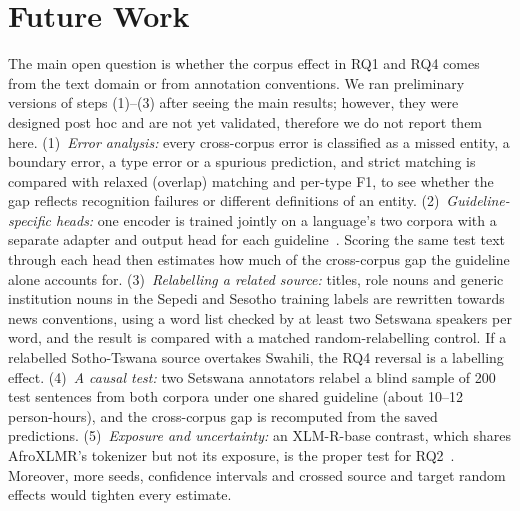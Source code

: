 \section{Future Work}\label{sec:future}
The main open question is whether the corpus effect in RQ1 and RQ4 comes from the text domain or from annotation conventions. We ran preliminary versions of steps (1)--(3) after seeing the main results; however, they were designed post hoc and are not yet validated, therefore we do not report them here.
(1)~\textit{Error analysis:} every cross-corpus error is classified as a missed entity, a boundary error, a type error or a spurious prediction, and strict matching is compared with relaxed (overlap) matching and per-type F1, to see whether the gap reflects recognition failures or different definitions of an entity.
(2)~\textit{Guideline-specific heads:} one encoder is trained jointly on a language's two corpora with a separate adapter and output head for each guideline~\cite{stymne2018,crichton2017,houlsby2019,pfeiffer2020}. Scoring the same test text through each head then estimates how much of the cross-corpus gap the guideline alone accounts for.
(3)~\textit{Relabelling a related source:} titles, role nouns and generic institution nouns in the Sepedi and Sesotho training labels are rewritten towards news conventions, using a word list checked by at least two Setswana speakers per word, and the result is compared with a matched random-relabelling control. If a relabelled Sotho-Tswana source overtakes Swahili, the RQ4 reversal is a labelling effect.
(4)~\textit{A causal test:} two Setswana annotators relabel a blind sample of 200 test sentences from both corpora under one shared guideline (about 10--12 person-hours), and the cross-corpus gap is recomputed from the saved predictions.
(5)~\textit{Exposure and uncertainty:} an XLM-R-base contrast, which shares AfroXLMR's tokenizer but not its exposure, is the proper test for RQ2~\cite{conneau2020,alabi2022}. Moreover, more seeds, confidence intervals and crossed source and target random effects would tighten every estimate.
